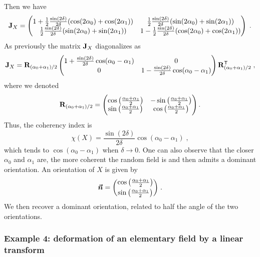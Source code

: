 \documentclass{elsarticle}
\begin{document}
Then we have
\[
\mathbf{J}_X=\begin{pmatrix}
1+\frac 1 2\frac{\sin(2\delta)}{2\delta}( \cos(2\alpha_0)+\cos(2\alpha_1)) & \frac 1 2\frac{\sin(2\delta)}{2\delta}(\sin(2\alpha_0)+\sin(2\alpha_1)) \\ \frac 1 2\frac{\sin(2\delta)}{2\delta}(\sin(2\alpha_0)+\sin(2\alpha_1)) & 1-\frac 1 2\frac{\sin(2\delta)}{2\delta}( \cos(2\alpha_0)+\cos(2\alpha_1))
\end{pmatrix}\;.
\]
As previously the matrix $\mathbf{J}_X$ diagonalizes as
\[
\mathbf{J}_X=\mathbf{R}_{(\alpha_0+\alpha_1)/2} \begin{pmatrix}
1+\frac{\sin(2\delta)}{2\delta}\cos(\alpha_0-\alpha_1) & 0 \\ 0 & 1-\frac{\sin(2\delta)}{2\delta}\cos(\alpha_0-\alpha_1)\end{pmatrix}\mathbf{R}_{(\alpha_0+\alpha_1)/2}^{\mathsf{T}}\;,
\]
where we denoted
\[
\mathbf{R}_{(\alpha_0+\alpha_1)/2}=\begin{pmatrix}\cos \left(\frac{\alpha_0+\alpha_1}{2}\right) & -\sin \left(\frac{\alpha_0+\alpha_1}{2}\right) \\ \sin \left(\frac{\alpha_0+\alpha_1}{2}\right) & \cos \left(\frac{\alpha_0+\alpha_1}{2}\right)\end{pmatrix}.
\]
Thus, the coherency index is
\[
\chi(X)=\frac{\sin(2\delta)}{2\delta}\cos(\alpha_0-\alpha_1)\;,
\]
which tends to $\cos(\alpha_0-\alpha_1)$ when $\delta\to 0$. One can also observe that the closer $\alpha_0$ and $\alpha_1$ are, the more coherent the random field is and then admits a dominant orientation. An orientation of $X$ is given by  
\[
\bm{\vec n}=\binom{\cos \left(\frac{\alpha_0+\alpha_1}{2}\right)}{\sin \left(\frac{\alpha_0+\alpha_1}{2}\right)}\;.
\]
We then recover a dominant orientation, related to half the angle of the two orientations. 
\subsubsection{Example 4: deformation of an elementary field by a linear transform\\}\label{s:wav:based:orientation:ssi:ex4}
\end{document}
